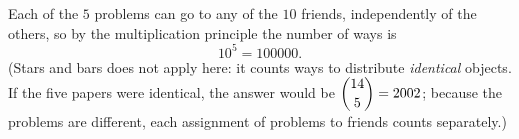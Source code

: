 Each of the $5$ problems can go to any of the $10$ friends, independently of the others, so by the multiplication principle the number of ways is
\[10^5=\boxed{100000}.\]
(Stars and bars does not apply here: it counts ways to distribute \emph{identical} objects. If the five papers were identical, the answer would be $\dbinom{14}{5}=2002$; because the problems are different, each assignment of problems to friends counts separately.)
